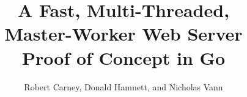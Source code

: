 \documentclass[10pt]{article}
\begin{document}
\title{
  A Fast, Multi-Threaded, \\
  Master-Worker Web Server \\
  \Large Proof of Concept in Go}
  
\author{Robert Carney, Donald Hamnett, and Nicholas Vann}
\maketitle
\end{document}
